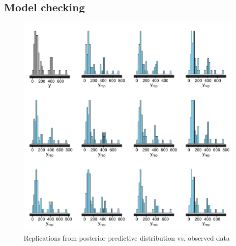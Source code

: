 \subsection{Model checking}
\label{subsection_model_checking}


\begin{figure}
\centering
	\includegraphics[scale=0.7]{sections/figs/ck_pp_y_vs_yrep_hists}
\caption{Replications from posterior predictive distribution vs. observed data}
\label{fig:ck_pp_hists}
\end{figure}

